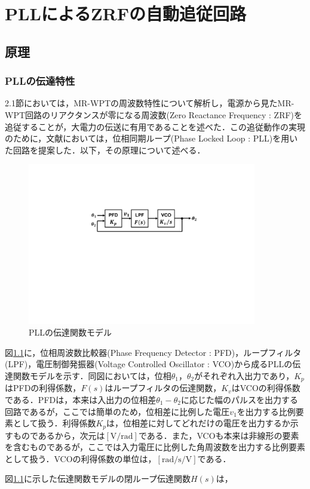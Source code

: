 \chapter{PLLによるZRFの自動追従回路}
\section{原理}
\subsection{PLLの伝達特性}
2.1節においては，MR-WPTの周波数特性について解析し，電源から見たMR-WPT回路のリアクタンスが零になる周波数(Zero Reactance Frequency : ZRF)を追従することが，大電力の伝送に有用であることを述べた．この追従動作の実現のために，文献\cite{Fujita2019a}においては，位相同期ループ(Phase Locked Loop : PLL)を用いた回路を提案した．以下，その原理について述べる．\par 

\begin{figure}[b]
\begin{center}

\includegraphics[width=100mm]{figures/pll.pdf}
\caption{PLLの伝達関数モデル}
\label{pll}
\end{center}

\end{figure}

図\ref{pll}に，位相周波数比較器(Phase Frequency Detector : PFD)，ループフィルタ(LPF)，電圧制御発振器(Voltage Controlled Oscillator : VCO)から成るPLLの伝達関数モデルを示す．同図においては，位相$\theta_1$，$\theta_2$がそれぞれ入出力であり，$K_{p}$はPFDの利得係数，$F(s )$はループフィルタの伝達関数，$K_v$はVCOの利得係数である．PFDは，本来は入出力の位相差$\theta_1-\theta_2$に応じた幅のパルスを出力する回路であるが，ここでは簡単のため，位相差に比例した電圧$v_1$を出力する比例要素として扱う．利得係数$K_p$は，位相差に対してどれだけの電圧を出力するか示すものであるから，次元は$\mathrm{[V/rad]}$である．また，VCOも本来は非線形の要素を含むものであるが，ここでは入力電圧に比例した角周波数を出力する比例要素として扱う．VCOの利得係数の単位は，$\mathrm{[rad/s/V]}$である．\par 
図\ref{pll}に示した伝達関数モデルの閉ループ伝達関数$H(s)$は，

